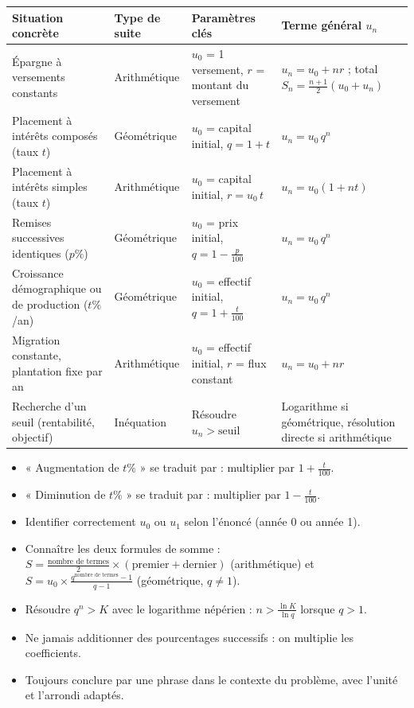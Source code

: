 \documentclass[11pt]{article}
\begin{document}
\begin{center}
\begin{tabularx}{\linewidth}{|l|X|X|X|}\hline
\rowcolor{popblueL}
\textbf{Situation concrète} & \textbf{Type de suite} & \textbf{Paramètres clés} & \textbf{Terme général $u_n$} \\ \hline
Épargne à versements constants & Arithmétique & $u_0$ = 1\up{er} versement, $r$ = montant du versement & $u_n = u_0 + nr$ ; total $S_n = \frac{n+1}{2}(u_0 + u_n)$ \\ \hline
Placement à intérêts composés (taux $t$) & Géométrique & $u_0$ = capital initial, $q = 1+t$ & $u_n = u_0\, q^n$ \\ \hline
Placement à intérêts simples (taux $t$) & Arithmétique & $u_0$ = capital initial, $r = u_0\, t$ & $u_n = u_0(1+nt)$ \\ \hline
Remises successives identiques ($p\%$) & Géométrique & $u_0$ = prix initial, $q = 1 - \frac{p}{100}$ & $u_n = u_0\, q^n$ \\ \hline
Croissance démographique ou de production ($t\%$/an) & Géométrique & $u_0$ = effectif initial, $q = 1 + \frac{t}{100}$ & $u_n = u_0\, q^n$ \\ \hline
Migration constante, plantation fixe par an & Arithmétique & $u_0$ = effectif initial, $r$ = flux constant & $u_n = u_0 + nr$ \\ \hline
Recherche d'un seuil (rentabilité, objectif) & Inéquation & Résoudre $u_n > \text{seuil}$ & Logarithme si géométrique, résolution directe si arithmétique \\ \hline
\end{tabularx}
\end{center}

\begin{aretenir}
\begin{itemize}
    \item « Augmentation de $t\%$ » se traduit par : multiplier par $1 + \frac{t}{100}$.
    \item « Diminution de $t\%$ » se traduit par : multiplier par $1 - \frac{t}{100}$.
    \item Identifier correctement $u_0$ ou $u_1$ selon l'énoncé (année 0 ou année 1).
    \item Connaître les deux formules de somme : $S = \frac{\text{nombre de termes}}{2}\times(\text{premier} + \text{dernier})$ (arithmétique) et $S = u_0 \times \frac{q^{\text{nombre de termes}} - 1}{q - 1}$ (géométrique, $q \neq 1$).
    \item Résoudre $q^n > K$ avec le logarithme népérien : $n > \frac{\ln K}{\ln q}$ lorsque $q > 1$.
    \item Ne jamais additionner des pourcentages successifs : on multiplie les coefficients.
    \item Toujours conclure par une phrase dans le contexte du problème, avec l'unité et l'arrondi adaptés.
\end{itemize}
\end{aretenir}
\end{document}
